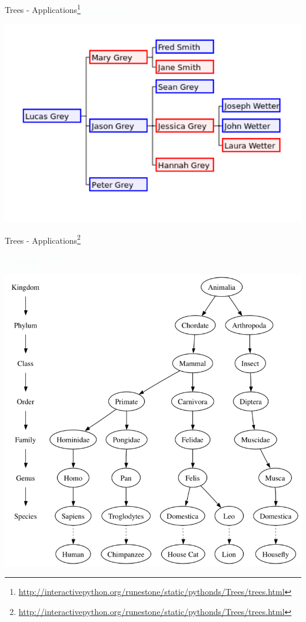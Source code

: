 \documentclass{beamer}
\newcommand{\tblue}[1]{{\Large {\textcolor{azure}{#1}}}}
\begin{document}
\begin{frame}{Trees - Applications\footnote{\url{http://interactivepython.org/runestone/static/pythonds/Trees/trees.html}}}
\tblue{Family Tree:}
\begin{center}
    \includegraphics[scale=0.44]{treesEg2.png}
\end{center}
\end{frame}


\begin{frame}{Trees - Applications\footnote{\url{http://interactivepython.org/runestone/static/pythonds/Trees/trees.html}}}

\tblue{Taxonomy Tree:}
\begin{center}
    \includegraphics[scale=0.4]{treesEg1.png}
\end{center}
\end{frame}
\end{document}
